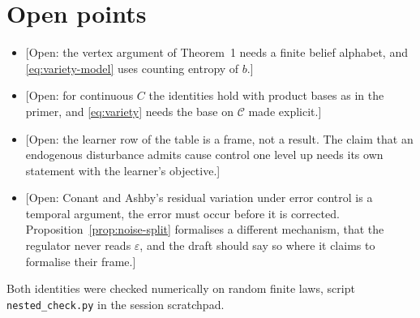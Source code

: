 \documentclass[10pt]{article}
\theoremstyle{plain}
\theoremstyle{remark}
\newcommand{\Ccal}{\mathcal C}
\newcommand{\open}[1]{\textcolor{red!70!black}{[Open: #1]}}
\begin{document}
\section{Open points}
\begin{itemize}
  \item \open{the vertex argument of Theorem~1 needs a finite belief alphabet, and \eqref{eq:variety-model} uses counting entropy of $b$.}
  \item \open{for continuous $C$ the identities hold with product bases as in the primer, and \eqref{eq:variety} needs the base on $\Ccal$ made explicit.}
  \item \open{the learner row of the table is a frame, not a result. The claim that an endogenous disturbance admits cause control one level up needs its own statement with the learner's objective.}
  \item \open{Conant and Ashby's residual variation under error control is a temporal argument, the error must occur before it is corrected. Proposition~\ref{prop:noise-split} formalises a different mechanism, that the regulator never reads $\varepsilon$, and the draft should say so where it claims to formalise their frame.}
\end{itemize}
Both identities were checked numerically on random finite laws, script \texttt{nested\_check.py} in the session scratchpad.
\end{document}
